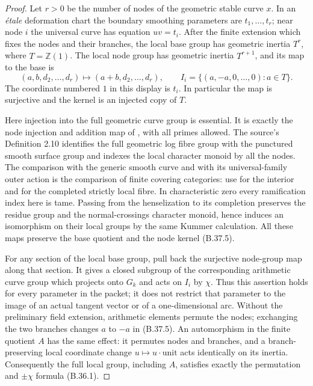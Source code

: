 \begin{proof}
Let $r>0$ be the number of nodes of the geometric stable
curve $x$. In an \emph{\'etale} deformation chart the
boundary smoothing parameters are $t_1,\ldots,t_r$;
near node $i$ the universal curve has equation
$uv=t_i$. After the finite extension which fixes the
nodes and their branches, the local base group has
geometric inertia
$T^r$, where $T=\widehat{\mathbb Z}(1)$.
The local node group has geometric inertia
$T^{r+1}$, and its map to the base is
\[
 (a,b,d_2,\ldots,d_r)
        \longmapsto (a+b,d_2,\ldots,d_r),
 \qquad
 I_i=\{(a,-a,0,\ldots,0):a\in T\}.
 \tag{B.37.5}
\]
The coordinate numbered $1$ in this display is $t_i$.
In particular the map is surjective and the kernel
is an injected copy of $T$.

Here injection into the full geometric curve group is
essential. It is exactly the node injection and addition
map of \cite[Lemma 2.11(ii)--(iii)]{F-HoshiMochizukiNodes},
with all primes allowed. The source's Definition 2.10
identifies the full geometric log fibre group with the
punctured smooth surface group and indexes the local
character monoid by all the nodes. The comparison with
the generic smooth curve and with its universal-family
outer action is the comparison of finite covering
categories: use \cite[Theorem 7.6]{F-Illusie} for the
interior and \cite[Corollary 3.9]{F-HoshiLog} for the
completed strictly local fibre. In characteristic zero
every ramification index here is tame. Passing from the
henselization to its completion preserves the residue
group and the normal-crossings character monoid, hence
induces an isomorphism on their local groups by the same
Kummer calculation. All these maps preserve the base
quotient and the node kernel (B.37.5).

For any section of the local base group, pull back the
surjective node-group map along that section. It gives
a closed subgroup of the corresponding arithmetic
curve group which projects onto $G_k$ and acts on
$I_i$ by $\chi$. Thus this assertion holds for every
parameter in the packet; it does not restrict that
parameter to the image of an actual tangent vector
or of a one-dimensional arc. Without the preliminary
field extension, arithmetic elements permute the nodes;
exchanging the two branches changes $a$ to $-a$ in
(B.37.5). An automorphism in the finite quotient $A$
has the same effect: it permutes nodes and branches,
and a branch-preserving local coordinate change
$u\mapsto u\cdot\text{unit}$ acts identically on its
inertia. Consequently the full local group, including
$A$, satisfies exactly the permutation and $\pm\chi$
formula (B.36.1).


\end{proof}
